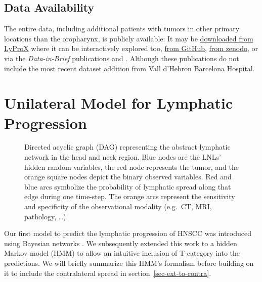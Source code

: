 \documentclass[
  sn-mathphys-num,
]{sn-jnl}
\begin{document}
\subsection{Data Availability}\label{data-availability}

The entire data, including additional patients with tumors in other
primary locations than the oropharynx, is publicly available: It may be
\href{https://lyprox.org/patients/dataset}{downloaded from LyProX} where
it can be interactively explored too,
\href{https://github.com/rmnldwg/lydata}{from GitHub},
\href{https://zenodo.org/search?q=lydata}{from zenodo}, or via the
\emph{Data-in-Brief} publications \citet{ludwig_dataset_2022} and
\citet{ludwig_multi-centric_2023}. Although these publications do not
include the most recent dataset addition from Vall d'Hebron Barcelona
Hospital.

\section{Unilateral Model for Lymphatic
Progression}\label{sec-unilateral}

\begin{figure}


\caption{\label{fig-small-graph}Directed acyclic graph (DAG)
representing the abstract lymphatic network in the head and neck region.
Blue nodes are the LNLs' hidden random variables, the red node
represents the tumor, and the orange square nodes depict the binary
observed variables. Red and blue arcs symbolize the probability of
lymphatic spread along that edge during one time-step. The orange arcs
represent the sensitivity and specificity of the observational modality
(e.g.~CT, MRI, pathology, \ldots).}

\end{figure}%

Our first model to predict the lymphatic progression of HNSCC was
introduced using Bayesian networks \citep{pouymayou_bayesian_2019}. We
subsequently extended this work to a hidden Markov model (HMM)
\citep{ludwig_hidden_2021} to allow an intuitive inclusion of T-category
into the predictions. We will briefly summarize this HMM's formalism
before building on it to include the contralateral spread in
section~\ref{sec-ext-to-contra}.
\end{document}
